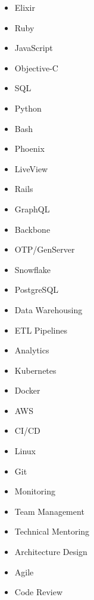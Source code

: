 \begin{itemize}[leftmargin=*, itemsep=0pt, parsep=0pt, topsep=0pt]
    \item Elixir
    \item Ruby
    \item JavaScript
    \item Objective-C
    \item SQL
    \item Python
    \item Bash
\end{itemize}
\vspace{0.5em}

\begin{itemize}[leftmargin=*, itemsep=0pt, parsep=0pt, topsep=0pt]
    \item Phoenix
    \item LiveView
    \item Rails
    \item GraphQL
    \item Backbone
    \item OTP/GenServer
\end{itemize}
\vspace{0.5em}

\begin{itemize}[leftmargin=*, itemsep=0pt, parsep=0pt, topsep=0pt]
    \item Snowflake
    \item PostgreSQL
    \item Data Warehousing
    \item ETL Pipelines
    \item Analytics
\end{itemize}
\vspace{0.5em}

\begin{itemize}[leftmargin=*, itemsep=0pt, parsep=0pt, topsep=0pt]
    \item Kubernetes
    \item Docker
    \item AWS
    \item CI/CD
    \item Linux
    \item Git
    \item Monitoring
\end{itemize}
\vspace{0.5em}

\begin{itemize}[leftmargin=*, itemsep=0pt, parsep=0pt, topsep=0pt]
    \item Team Management
    \item Technical Mentoring
    \item Architecture Design
    \item Agile
    \item Code Review
\end{itemize}
\vspace{0.5em}

